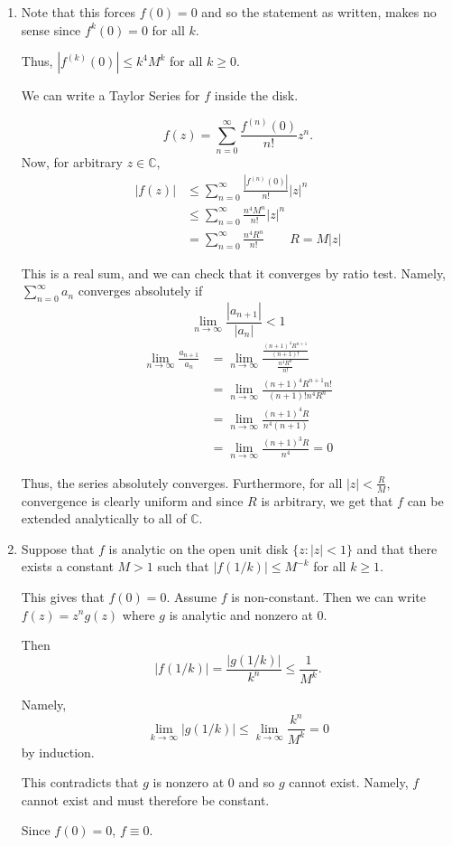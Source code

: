 \documentclass[12pt]{Qual}
\begin{document}
\begin{solution}$\,$
\begin{enumerate}[label=(\alph*)]
    \item Note that this forces $f(0)=0$ and so the statement as written, makes no sense since $f^k(0)=0$ for all $k.$

    Thus, $|f^{(k)}(0)|\le k^4M^k$ for all $k\ge0.$

    We can write a Taylor Series for $f$ inside the disk.

    $$f(z)=\sum_{n=0}^\infty\frac{f^{(n)}(0)}{n!}z^n.$$ Now, for arbitrary $z\in\mathbb{C}$, \begin{align*}
        |f(z)|&\le\sum_{n=0}^\infty\frac{|f^{(n)}(0)|}{n!}|z|^n\\
        &\le\sum_{n=0}^\infty\frac{n^4M^n}{n!}|z|^n\\
        &=\sum_{n=0}^\infty\frac{n^4 R^n}{n!}\qquad R=M|z|
    \end{align*}

    This is a real sum, and we can check that it converges by ratio test. Namely, $\sum_{n=0}^\infty a_n$ converges absolutely if $$\lim_{n\to\infty}\frac{|a_{n+1}|}{|a_n|}<1$$ \begin{align*}
        \lim_{n\to\infty}\frac{a_{n+1}}{a_n}&=\lim_{n\to\infty}\frac{\frac{(n+1)^4 R^{n+1}}{(n+1)!}}{\frac{n^4 R^n}{n!}}\\
        &=\lim_{n\to\infty}\frac{(n+1)^4 R^{n+1} n!}{(n+1)!n^4 R^n}\\
        &=\lim_{n\to\infty}\frac{(n+1)^4 R}{n^4(n+1)}\\
        &=\lim_{n\to\infty}\frac{(n+1)^3 R}{n^4}=0
    \end{align*}

    Thus, the series absolutely converges. Furthermore, for all $|z|<\frac{R}{M}$, convergence is clearly uniform and since $R$ is arbitrary, we get that $f$ can be extended analytically to all of $\mathbb{C}$.

    \item Suppose that $f$ is analytic on the open unit disk $\{z:|z|<1\}$ and that there exists a constant $M>1$ such that $|f(1/k)|\le M^{-k}$ for all $k\ge1$.

    This gives that $f(0)=0$. Assume $f$ is non-constant. Then we can write $f(z)=z^ng(z)$ where $g$ is analytic and nonzero at $0$.

    Then $$|f(1/k)|=\frac{|g(1/k)|}{k^n}\le\frac{1}{M^k}.$$

    Namely, $$\lim_{k\to\infty}|g(1/k)|\le\lim_{k\to\infty}\frac{k^n}{M^k}=0$$ by induction.

    This contradicts that $g$ is nonzero at $0$ and so $g$ cannot exist. Namely, $f$ cannot exist and must therefore be constant.

    Since $f(0)=0$, $f\equiv 0.$
\end{enumerate}
\end{solution}
\end{document}
